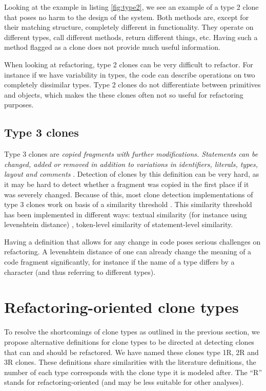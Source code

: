 Looking at the example in listing \ref{fig:type2}, we see an example of a type 2 clone that poses no harm to the design of the system. Both methods are, except for their matching structure, completely different in functionality. They operate on different types, call different methods, return different things, etc. Having such a method flagged as a clone does not provide much useful information.

When looking at refactoring, type 2 clones can be very difficult to refactor. For instance if we have variability in types, the code can describe operations on two completely dissimilar types. Type 2 clones do not differentiate between primitives and objects, which makes the these clones often not so useful for refactoring purposes.

\subsection{Type 3 clones}
Type 3 clones are \textit{copied fragments with further modifications. Statements can be changed, added or removed in addition to variations in identifiers, literals, types, layout and comments} \cite{roy2007survey}. Detection of clones by this definition can be very hard, as it may be hard to detect whether a fragment was copied in the first place if it was severely changed. Because of this, most clone detection implementations of type 3 clones work on basis of a similarity threshold \cite{svajlenko2014evaluating, cordy2011nicad}. This similarity threshold has been implemented in different ways: textual similarity (for instance using levenshtein distance) \cite{lavoie2011automated}, token-level similarity of statement-level similarity.

Having a definition that allows for any change in code poses serious challenges on refactoring. A levenshtein distance of one can already change the meaning of a code fragment significantly, for instance if the name of a type differs by a character (and thus referring to different types).

\section{Refactoring-oriented clone types}
To resolve the shortcomings of clone types as outlined in the previous section, we propose alternative definitions for clone types to be directed at detecting clones that can and should be refactored. We have named these clones type 1R, 2R and 3R clones. These definitions share similarities with the literature definitions, the number of each type corresponds with the clone type it is modeled after. The ``R'' stands for refactoring-oriented (and may be less suitable for other analyses).

